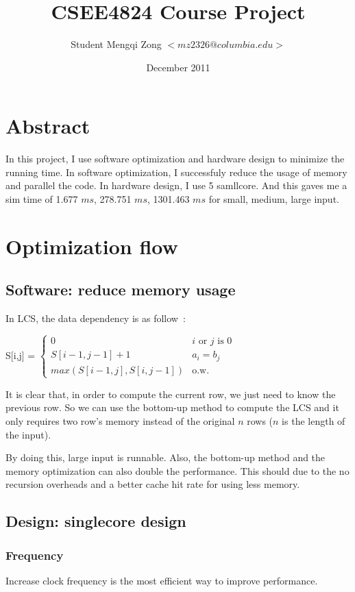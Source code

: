 \documentclass[twocolumn,letterpaper,10pt]{article}
\title{CSEE4824 Course Project}
\author{Student Mengqi Zong $<mz2326@columbia.edu>$}
\date{December 2011}
\begin{document}
\maketitle

\section{Abstract}

In this project, I use software optimization and hardware design to minimize the running time. In software optimization, I successfuly reduce the usage of memory and parallel the code. In hardware design, I use 5 samllcore. And this gaves me a sim time of 1.677 $ms$, 278.751 $ms$, 1301.463 $ms$ for small, medium, large input. 

\section{Optimization flow}

\subsection{Software: reduce memory usage}

In LCS, the data dependency is as follow~\cite{clrs}:

S[i,j] = $
\begin{cases}
 0 & i\text{ or }j\text{ is }0\\
 S[i-1,j-1]+1 & a_i=b_j \\
 max(S[i-1,j],S[i,j-1]) & \text{o.w.}
\end{cases} $

It is clear that, in order to compute the current row, we just need to know the previous row. So we can use the bottom-up method to compute the LCS and it only requires two row's memory instead of the original $n$ rows ($n$ is the length of the input).

By doing this, large input is runnable. Also, the bottom-up method and the memory optimization can also double the performance. This should due to the no recursion overheads and a better cache hit rate for using less memory.

\subsection{Design: singlecore design}

\subsubsection{Frequency}
Increase clock frequency is the most efficient way to improve performance.
\end{document}
